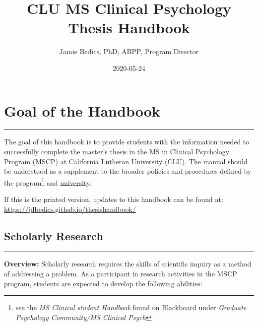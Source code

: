 \documentclass[openany]{book}
\title{CLU MS Clinical Psychology Thesis Handbook}
\author{Jamie Bedics, PhD, ABPP, Program Director}
\date{2020-05-24}
\begin{document}
\maketitle

{
\setcounter{tocdepth}{1}
\tableofcontents
}
\hypertarget{goal-of-the-handbook}{%
\chapter{Goal of the Handbook}\label{goal-of-the-handbook}}

\begin{center}\rule{0.5\linewidth}{0.5pt}\end{center}

The goal of this handbook is to provide students with the information needed to successfully complete the master's thesis in the MS in Clinical Psychology Program (MSCP) at California Lutheran University (CLU). The manual should be understood as a supplement to the broader policies and procedures defined by the program\footnote{see the \emph{MS Clinical student Handbook} found on Blackboard under \emph{Graduate Psychology Community/MS Clinical Psych}} and \href{https://www.callutheran.edu/students/student-conduct/student-handbook.html}{university}.

If this is the printed version, updates to this handbook can be found at: \url{https://jdbedics.github.io/thesishandbook/}

\hypertarget{scholarly-research}{%
\section{Scholarly Research}\label{scholarly-research}}

\begin{center}\rule{0.5\linewidth}{0.5pt}\end{center}

\textbf{Overview:} Scholarly research requires the skills of scientific inquiry as a method of addressing a problem. As a participant in research activities in the MSCP program, students are expected to develop the following abilities:
\end{document}
